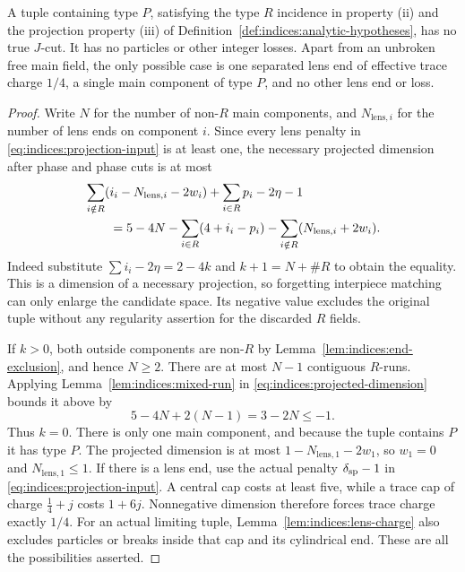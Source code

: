 \begin{proposition}\label{prop:indices:mixed-exclusion}
A tuple containing type $P$, satisfying the type $R$ incidence in
property (ii) and the projection property (iii) of
Definition~\ref{def:indices:analytic-hypotheses}, has no true $J$-cut.
It has no particles or other integer losses.  Apart from an unbroken
free main field, the only possible case is one separated lens end of
effective trace charge $1/4$, a single main component of type $P$, and no other
lens end or loss.
\end{proposition}
\begin{proof}
Write $N$ for the number of non-$R$ main components, and
$N_{\mathrm{lens},i}$ for the number of lens ends on component $i$.
Since every lens penalty in
\eqref{eq:indices:projection-input} is at least one, the necessary
projected dimension after phase and phase cuts is at most
\begin{align}
 &\sum_{i\notin R}(i_i-N_{\mathrm{lens},i}-2w_i)
       +\sum_{i\in R}p_i-2\eta-1
 \notag\\
 &\qquad=5-4N-\sum_{i\in R}(4+i_i-p_i)
                    -\sum_{i\notin R}(N_{\mathrm{lens},i}+2w_i).
 \label{eq:indices:projected-dimension}
\end{align}
Indeed substitute $\sum i_i-2\eta=2-4k$ and
$k+1=N+\#R$ to obtain the equality.  This is a dimension of a necessary
projection, so forgetting interpiece matching can only enlarge the
candidate space.  Its negative value excludes the original tuple
without any regularity assertion for the discarded $R$ fields.

If $k>0$, both outside components are non-$R$ by
Lemma~\ref{lem:indices:end-exclusion}, and hence $N\ge2$.
There are at most $N-1$ contiguous $R$-runs.  Applying
Lemma~\ref{lem:indices:mixed-run} in
\eqref{eq:indices:projected-dimension} bounds it above by
\[
 5-4N+2(N-1)=3-2N\le-1.
\]
Thus $k=0$.  There is only one main component, and because the tuple
contains $P$ it has type $P$.  The projected dimension is at most
$1-N_{\mathrm{lens},1}-2w_1$, so $w_1=0$ and
$N_{\mathrm{lens},1}\le1$.  If there is a lens end, use the actual penalty
$\delta_{\rm sp}-1$ in \eqref{eq:indices:projection-input}.  A central
cap costs at least five, while a trace cap of charge $\frac14+j$ costs
$1+6j$.  Nonnegative dimension therefore forces trace charge exactly
$1/4$.  For an actual limiting tuple,
Lemma~\ref{lem:indices:lens-charge} also excludes particles or
breaks inside that cap and its cylindrical end.  These are all the
possibilities asserted.
\end{proof}

